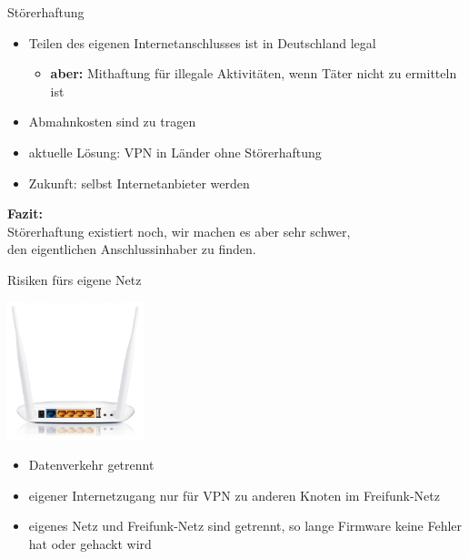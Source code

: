 \documentclass[handout]{beamer}
\begin{document}
\begin{frame}{Störerhaftung}
\begin{itemize}
\pause\item Teilen des eigenen Internetanschlusses ist in Deutschland legal
\begin{itemize}
	\pause\item \textbf{aber:} Mithaftung für illegale Aktivitäten, wenn Täter nicht zu ermitteln ist
\end{itemize}
\pause\item Abmahnkosten sind zu tragen
\vfill
\pause\item aktuelle Lösung: VPN in Länder ohne Störerhaftung
\pause\item Zukunft: selbst Internetanbieter werden
\end{itemize}
\vfill
\centering
\pause \textbf{Fazit:}\\Störerhaftung existiert noch, wir machen es aber sehr schwer,\\den eigentlichen Anschlussinhaber zu finden.

\end{frame}

\begin{frame}{Risiken fürs eigene Netz}
\vfill
\begin{center}
\includegraphics[height=4cm]{images/WR842ND-back}
\end{center}
\begin{itemize}
\pause\item Datenverkehr getrennt
\pause\item eigener Internetzugang nur für VPN zu anderen Knoten im Freifunk-Netz
\pause\item eigenes Netz und Freifunk-Netz sind getrennt, so lange Firmware keine Fehler hat oder gehackt wird
\end{itemize}
\vfill
\end{frame}
\end{document}
